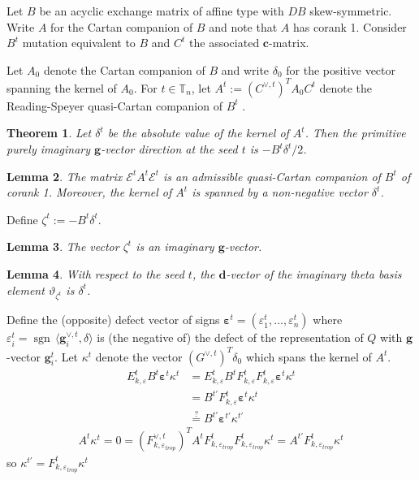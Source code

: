 \documentclass{amsart}
\newtheorem{theorem}{Theorem}
\newtheorem{lemma}[theorem]{Lemma}
\numberwithin{theorem}{section}
\newcommand{\bfc}{\boldsymbol{c}}
\newcommand{\bfd}{\boldsymbol{d}}
\newcommand{\bfg}{\boldsymbol{g}}
\newcommand{\cE}{\mathcal{E}}
\newcommand{\TT}{\mathbb{T}}
\newcommand{\sgn}{{\operatorname{sgn}}}
\begin{document}
  Let $B$ be an acyclic exchange matrix of affine type with $DB$ skew-symmetric.
  Write $A$ for the Cartan companion of $B$ and note that $A$ has corank 1.
  Consider $B^t$ mutation equivalent to $B$ and $C^t$ the associated $\bfc$-matrix.

  Let $A_0$ denote the Cartan companion of $B$ and write $\delta_0$ for the positive vector spanning the kernel of $A_0$.
  For $t\in\TT_n$, let $A^t:=(C^{\vee,t})^T A_0 C^t$ denote the Reading-Speyer quasi-Cartan companion of $B^t$ \cite[Cor. 3.29]{Combinatorial_Frameworks_for_Cluster_Algebras}.
  \begin{theorem}
    Let $\delta^t$ be the absolute value of the kernel of $A^t$.
    Then the primitive purely imaginary $\bfg$-vector direction at the seed $t$ is $-B^t\delta^t/2$.
  \end{theorem}

  \begin{lemma}
    The matrix $\cE^t A^t \cE^t$ is an admissible quasi-Cartan companion of $B^t$ of corank 1.
    Moreover, the kernel of $A^t$ is spanned by a non-negative vector $\delta^t$. 
  \end{lemma}

  Define $\zeta^t := -B^t \delta^t$.
  \begin{lemma}
    The vector $\zeta^t$ is an imaginary $\bfg$-vector.
  \end{lemma}

  \begin{lemma}
    With respect to the seed $t$, the $\bfd$-vector of the imaginary theta basis element $\vartheta_{\zeta^t}$ is $\delta^t$. 
  \end{lemma}

  Define the (opposite) defect vector of signs $\boldsymbol{\varepsilon}^t=(\varepsilon^t_1,\ldots,\varepsilon^t_n)$ where $\varepsilon^t_i=\sgn\,\langle \bfg^{\vee,t}_i,\delta\rangle$ is (the negative of) the defect of the representation of $Q$ with $\bfg$-vector $\bfg^t_i$.
  Let $\kappa^t$ denote the vector $(G^{\vee,t})^T\delta_0$ which spans the kernel of $A^t$.
  \begin{align*}
    E_{k,\varepsilon}^t B^t \boldsymbol{\varepsilon}^t \kappa^t
    &=
    E_{k,\varepsilon}^t B^t F^t_{k,\varepsilon} F^t_{k,\varepsilon} \boldsymbol{\varepsilon}^t \kappa^t\\
    &=
    B^{t'} F^t_{k,\varepsilon} \boldsymbol{\varepsilon}^t \kappa^t\\
    &\stackrel{?}{=} B^{t'} \boldsymbol{\varepsilon}^{t'} \kappa^{t'}
  \end{align*}
  \begin{align*}
    A^t\kappa^t=0=(F^{\vee,t}_{k,\varepsilon_{trop}})^T A^t F^t_{k,\varepsilon_{trop}} F^t_{k,\varepsilon_{trop}} \kappa^t=A^{t'} F^t_{k,\varepsilon_{trop}} \kappa^t
  \end{align*}
  so $\kappa^{t'}=F^t_{k,\varepsilon_{trop}} \kappa^t$
\end{document}
